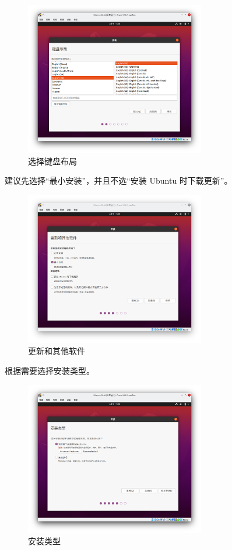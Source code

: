 \documentclass[UTF-8]{ctexart}
\begin{document}
				\begin{figure}[H]
					\centering
					\includegraphics[width=0.7\textwidth]{fig/ubuntu_install_2.png}
					\caption*{选择键盘布局}
				\end{figure}
			
				建议先选择“最小安装”，并且不选“安装 Ubuntu 时下载更新”。
			
				\begin{figure}[H]
					\centering
					\includegraphics[width=0.7\textwidth]{fig/ubuntu_install_4.png}
					\caption*{更新和其他软件}
				\end{figure}
			
				根据需要选择安装类型。
			
				\begin{figure}[H]
					\centering
					\includegraphics[width=0.7\textwidth]{fig/ubuntu_install_5.png}
					\caption*{安装类型}
				\end{figure}
			
\end{document}
